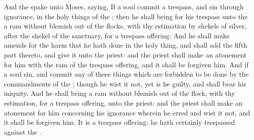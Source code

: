 \begin{biblechapter}
 And the \LORD spake unto Moses, saying,
\verse If a soul commit a trespass, and sin through ignorance, in the holy things of the \LORD; then he shall bring for his trespass unto the \LORD a ram without blemish out of the flocks, with thy estimation by shekels of silver, after the shekel of the sanctuary, for a trespass offering:
\verse And he shall make amends for the harm that he hath done in the holy thing, and shall add the fifth part thereto, and give it unto the priest: and the priest shall make an atonement for him with the ram of the trespass offering, and it shall be forgiven him.
\verse And if a soul sin, and commit any of these things which are forbidden to be done by the commandments of the \LORD; though he wist it not, yet is he guilty, and shall bear his iniquity.
\verse And he shall bring a ram without blemish out of the flock, with thy estimation, for a trespass offering, unto the priest: and the priest shall make an atonement for him concerning his ignorance wherein he erred and wist it not, and it shall be forgiven him.
\verse It is a trespass offering: he hath certainly trespassed against the \LORD.
\end{biblechapter}


